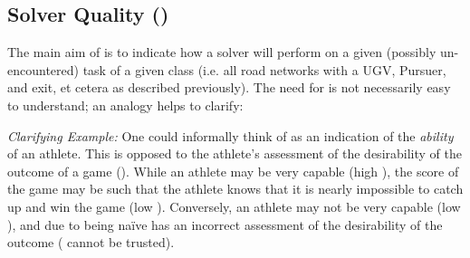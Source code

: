 

\subsection{Solver Quality (\xQ)} \label{sec:SQ}
    The main aim of \xQ{} is to indicate how a solver \solve{} will perform on a given (possibly un-encountered) task \task{} of a given class \taskclass{} (i.e. all road networks with a UGV, Pursuer, and exit, et cetera as described previously). The need for \xQ{} is not necessarily easy to understand; an analogy helps to clarify:
    
    \emph{Clarifying Example:} One could informally think of \xQ{} as an indication of the \emph{ability} of an athlete. This is opposed to the athlete's assessment of the desirability of the outcome of a game (\xO). While an athlete may be very capable (high \xQ), the score of the game may be such that the athlete knows that it is nearly impossible to catch up and win the game (low \xO). Conversely, an athlete may not be very capable (low \xQ), and due to being na\"{i}ve has an incorrect assessment of the desirability of the outcome (\xO{} cannot be trusted).
    
